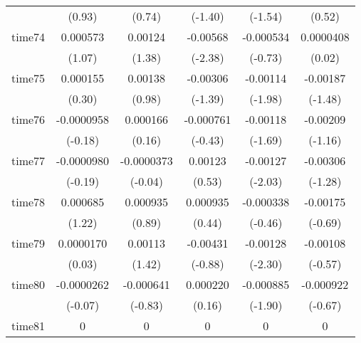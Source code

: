 \begin{table}[htbp]
\begin{tabular}{l*{5}{c}}
            &      (0.93)         &      (0.74)         &     (-1.40)         &     (-1.54)         &      (0.52)         \\
time74      &    0.000573         &     0.00124         &    -0.00568\sym{*}  &   -0.000534         &   0.0000408         \\
            &      (1.07)         &      (1.38)         &     (-2.38)         &     (-0.73)         &      (0.02)         \\
time75      &    0.000155         &     0.00138         &    -0.00306         &    -0.00114\sym{*}  &    -0.00187         \\
            &      (0.30)         &      (0.98)         &     (-1.39)         &     (-1.98)         &     (-1.48)         \\
time76      &  -0.0000958         &    0.000166         &   -0.000761         &    -0.00118         &    -0.00209         \\
            &     (-0.18)         &      (0.16)         &     (-0.43)         &     (-1.69)         &     (-1.16)         \\
time77      &  -0.0000980         &  -0.0000373         &     0.00123         &    -0.00127\sym{*}  &    -0.00306         \\
            &     (-0.19)         &     (-0.04)         &      (0.53)         &     (-2.03)         &     (-1.28)         \\
time78      &    0.000685         &    0.000935         &    0.000935         &   -0.000338         &    -0.00175         \\
            &      (1.22)         &      (0.89)         &      (0.44)         &     (-0.46)         &     (-0.69)         \\
time79      &   0.0000170         &     0.00113         &    -0.00431         &    -0.00128\sym{*}  &    -0.00108         \\
            &      (0.03)         &      (1.42)         &     (-0.88)         &     (-2.30)         &     (-0.57)         \\
time80      &  -0.0000262         &   -0.000641         &    0.000220         &   -0.000885         &   -0.000922         \\
            &     (-0.07)         &     (-0.83)         &      (0.16)         &     (-1.90)         &     (-0.67)         \\
time81      &           0         &           0         &           0         &           0         &           0         \\

\end{tabular}
\end{table}
